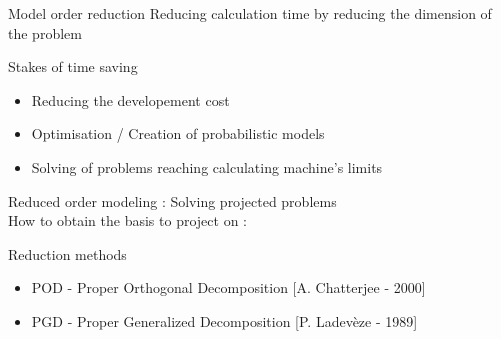 \documentclass[12pt]{beamer}
\newcommand\FontGoal{\fontsize{9.5}{11}\selectfont}
\begin{document}
\begin{frame}{Model order reduction}
\FontGoal
	Reducing calculation time by reducing the dimension of the problem
	\begin{block}{Stakes of time saving}
	{
	\begin{itemize}
	\item Reducing the developement cost
	\item Optimisation / Creation of probabilistic models
	\item Solving of problems reaching calculating machine's limits
	\end{itemize}
	}
	\end{block}
	
	Reduced order modeling : Solving projected problems\\
	How to obtain the basis to project on :
	\begin{block}{Reduction methods}
	{
	\begin{itemize}
	\item POD - Proper Orthogonal Decomposition [A. Chatterjee - 2000]
	\item PGD - Proper Generalized Decomposition [P. Ladevèze - 1989]
	\end{itemize}
	}
	\end{block}
	

\end{frame}
\end{document}
